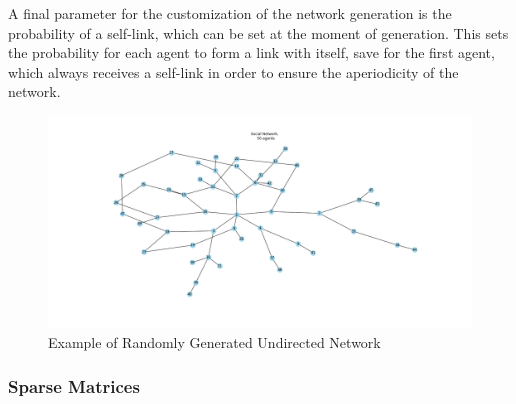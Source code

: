 \documentclass[a4paper, 12pt]{report}
\begin{document}
\noindent A final parameter  for the customization of the network generation is the probability of a self-link, which can be set at the moment of generation. This sets the probability for each agent to form a link with itself, save for the first agent, which always receives a self-link in order to ensure the aperiodicity of the network.
\begin{center}
    \begin{figure}[!htbp]
        \centering
        \includegraphics[width=1.1\textwidth]{ThesisKI/Images/NoneGraphRandom.png}
        \caption{Example of Randomly Generated Undirected Network}
        \label{network:random}
    \end{figure}
\end{center}

\newpage

\subsubsection{Sparse Matrices}
\end{document}
